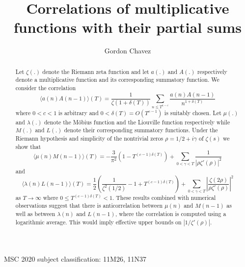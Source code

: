\documentclass[11pt,article]{amsart}
\numberwithin{equation}{section}
\numberwithin{equation}{section}
\numberwithin{lemma}{section}
\numberwithin{prop}{section}
\begin{document}
{
 \title[Correlations of multiplicative functions with their partial sums]{Correlations of multiplicative functions with their partial sums}


  \author{Gordon Chavez}

\date{}
  \maketitle
} 



\begin{abstract}
Let $\zeta(.)$ denote the Riemann zeta function and let $a(.)$ and $A(.)$ respectively denote a multiplicative function and its corresponding summatory function. We consider the correlation 
$$
\langle a(n)A(n-1) \rangle (T) = \frac{1}{\zeta(1+\delta(T))}\sum_{n\leq T^{1-c}}\frac{a(n)A(n-1)}{n^{1+\delta(T)}}
$$
where $0<c<1$ is arbitrary and $0<\delta(T)=O\left(T^{c-1}\right)$ is suitably chosen. Let $\mu(.)$ and $\lambda(.)$ denote the M{\"o}bius function and the Liouville function respectively while $M(.)$ and $L(.)$ denote their corresponding summatory functions. Under the Riemann hypothesis and simplicity of the nontrivial zeros $\rho=1/2+ i \gamma$ of $\zeta(s)$ we show that 
$$
\langle \mu(n)M(n-1) \rangle (T)= -\frac{3}{\pi^{2}}\left(1-T^{(c-1)\delta(T)}\right)+\sum_{0<\gamma<T}\frac{1}{\left|\rho\zeta'(\rho)\right|^{2}}
$$
and
$$
\langle \lambda(n)L(n-1) \rangle (T)=\frac{1}{2}\left(\frac{1}{\zeta^{2}(1/2)}-1+T^{(c-1)\delta(T)}\right)+\sum_{0<\gamma<T}\left|\frac{\zeta(2\rho)}{\rho\zeta'(\rho)}\right|^{2}
$$
as $T\rightarrow \infty$ where  $0\leq T^{(c-1)\delta(T)}<1$. These results combined with numerical observations suggest that there is anticorrelation between $\mu(n)$ and $M(n-1)$ as well as between $\lambda(n)$ and $L(n-1)$, where the correlation is computed using a logarithmic average. This would imply effective upper bounds on $\left|1/\zeta'(\rho)\right|$.
\end{abstract}


MSC 2020 subject classification: 11M26, 11N37
\setcounter{tocdepth}{1}
\end{document}
